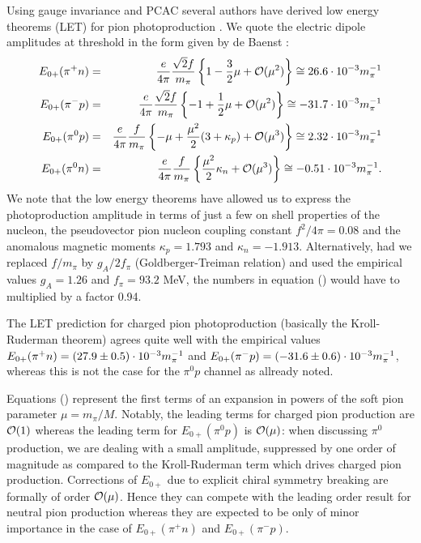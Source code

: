 Using gauge invariance and PCAC several authors have derived low energy
theorems (LET) for pion photoproduction \cite{AG,Bae,VZ}. We quote the electric
dipole amplitudes at threshold in the form given by de Baenst \cite{Bae}: 
\alpheqn
\begin{eqnarray}
\label{LET}
E_{0+} (\pi^+ n) &=& \frac{e}{4\pi} \frac{\sqrt{2}f}{m_\pi}
    \left\{ 1 - \frac{3}{2}\mu + {\cal O}(\mu^2) \right\}
    \cong 26.6 \cdot 10^{-3}m_{\pi}^{-1} \\
E_{0+} (\pi^- p) &=& \frac{e}{4\pi} \frac{\sqrt{2}f}{m_\pi}
     \left\{ -1 + \frac{1}{2}\mu + {\cal O}(\mu^2) \right\}
    \cong -31.7 \cdot 10^{-3}m_{\pi}^{-1} \\
E_{0+} (\pi^0 p) &=& \frac{e}{4\pi} \frac{f}{m_\pi}
     \left\{ -\mu + \frac{\mu^2}{2}(3+\kappa_p ) +
  {\cal O}(\mu^3) \right\}    \cong 2.32
  \cdot 10^{-3}m_{\pi}^{-1} \\
E_{0+} (\pi^0 n) &=& \frac{e}{4\pi} \frac{f}{m_\pi}
     \left\{  \frac{\mu^2}{2}\kappa_n  +
  {\cal O}(\mu^3) \right\}  \cong -0.51 \cdot 10^{-3}m_{\pi}^{-1} .
\end{eqnarray}
\reseteqn
We note that the low energy theorems have allowed us to express the 
photoproduction amplitude in terms of just a few on shell
properties of the nucleon, the pseudovector pion nucleon 
coupling constant $f^2/4\pi=0.08$ and the anomalous magnetic
moments $\kappa_p=1.793$ and $\kappa_n=-1.913$. Alternatively,
had we replaced $f/m_\pi$ by $g_A/2 f_\pi$ (Goldberger-Treiman relation)
and used the empirical values $g_A=1.26$ and $f_\pi=93.2$ MeV, the numbers 
in equation () would have to multiplied by a factor 0.94.  

The LET prediction for charged pion photoproduction (basically the 
Kroll-Ruderman theorem) agrees quite well with the empirical values
\cite{BL} $E_{0+}(\pi^+ n)=(27.9\pm 0.5)\cdot 10^{-3}m_{\pi}^{-1}$ and $E_{0+}(\pi^- p)
=(-31.6\pm 0.6)\cdot 10^{-3}m_{\pi}^{-1}$, whereas this is not the case for the $\pi^0 p$
channel as allready noted.

Equations () represent the first terms of an expansion in
powers of the soft pion parameter $\mu=m_{\pi}/M$. Notably, the 
leading terms for charged pion production are ${\cal O}(1)$ whereas
the leading term for $E_{0+}(\pi^0 p)$ is ${\cal O}(\mu)$: 
when discussing $\pi^0$ production, we are dealing with a small amplitude,
suppressed by one order of magnitude as compared to the Kroll-Ruderman term
which drives charged pion production. Corrections of $E_{0+}$ due 
to explicit chiral symmetry breaking are formally of order ${\cal O}(\mu)$.
Hence they can compete with the leading order result for neutral pion
production whereas they are expected to be only of minor importance 
in the case of $E_{0+}(\pi^+ n)$ and $E_{0+}(\pi^- p)$.      


